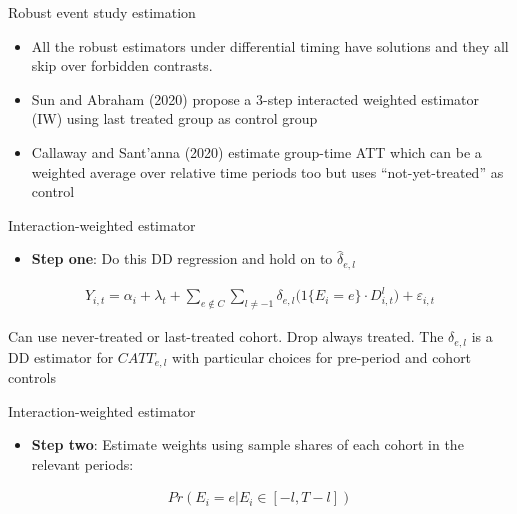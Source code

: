 \documentclass{beamer}
\begin{document}
\begin{frame}{Robust event study estimation}


\begin{itemize}
\item All the robust estimators under differential timing have solutions and they all skip over forbidden contrasts. 
\item Sun and Abraham (2020) propose a 3-step interacted weighted estimator (IW) using last treated group as control group
\item Callaway and Sant'anna (2020) estimate group-time ATT which can be a weighted average over relative time periods too but uses ``not-yet-treated'' as control
\end{itemize}

\end{frame}




\begin{frame}{Interaction-weighted estimator}

\begin{itemize}
\item \textbf{Step one}: Do this DD regression and hold on to $\widehat{\delta}_{e,l}$
\end{itemize}

\begin{eqnarray*}
Y_{i,t} = \alpha_i + \lambda_t + \sum_{e \notin C} \sum_{l \neq -1} \delta_{e,l} \big (1 \{ E_i = e \} \cdot D_{i,t}^l \big ) + \varepsilon_{i,t}
\end{eqnarray*}


\bigskip

Can use never-treated or last-treated cohort. Drop always treated. The $\delta_{e,l}$ is a DD estimator for $CATT_{e,l}$ with particular choices for pre-period and cohort controls

\end{frame}


\begin{frame}{Interaction-weighted estimator}

\begin{itemize}
\item \textbf{Step two}: Estimate weights using sample shares of each cohort in the relevant periods:
\end{itemize}

\begin{eqnarray*}
Pr(E_i=e|E_i \in [-l,T-l])
\end{eqnarray*}

\end{frame}
\end{document}
